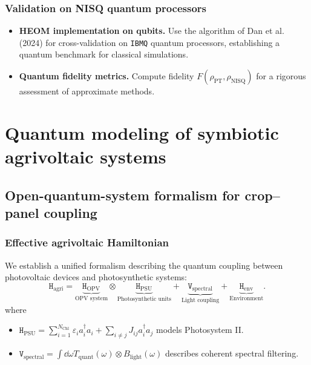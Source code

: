 \documentclass[12pt, a4paper]{article}
\begin{document}
\subsubsection{Validation on NISQ quantum processors}

\begin{itemize}
    \item \textbf{HEOM implementation on qubits.} Use the algorithm of Dan et al. (2024) for cross-validation on \texttt{IBMQ} quantum processors, establishing a quantum benchmark for classical simulations.
    
    \item \textbf{Quantum fidelity metrics.} Compute fidelity $F(\rho_{\text{PT}}, \rho_{\text{NISQ}})$ for a rigorous assessment of approximate methods.
\end{itemize}

\section{Quantum modeling of symbiotic agrivoltaic systems}

\subsection{Open-quantum-system formalism for crop–panel coupling}

\subsubsection{Effective agrivoltaic Hamiltonian}

We establish a unified formalism describing the quantum coupling between photovoltaic devices and photosynthetic systems:
\begin{equation}
\mathtt{H}_{\text{agri}} = \underbrace{\mathtt{H}_{\text{OPV}}}_{\text{OPV system}} \otimes \underbrace{\mathtt{H}_{\text{PSU}}}_{\text{Photosynthetic units}} + \underbrace{\mathtt{V}_{\text{spectral}}}_{\text{Light coupling}} + \underbrace{\mathtt{H}_{\text{env}}}_{\text{Environment}}.
\end{equation}
where
\begin{itemize}
    \item $\mathtt{H}_{\text{PSU}} = \sum_{i=1}^{N_{\text{Chl}}} \varepsilon_i a_i^\dagger a_i + \sum_{i\neq j} J_{ij} a_i^\dagger a_j$ models Photosystem II.

    \item $\mathtt{V}_{\text{spectral}} = \int \dd{\omega} T_{\text{quant}}(\omega) \otimes B_{\text{light}}(\omega)$ describes coherent spectral filtering.
\end{itemize}
\end{document}
